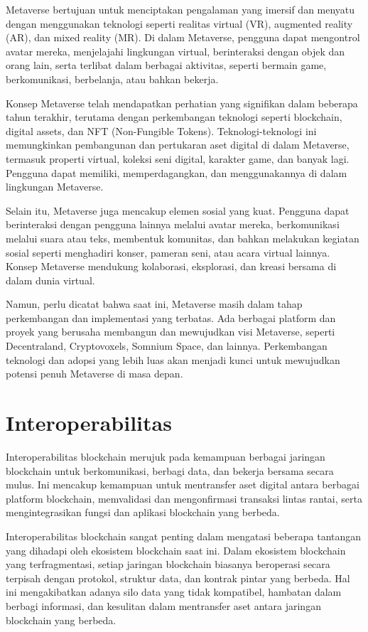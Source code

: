 Metaverse bertujuan untuk menciptakan pengalaman yang imersif dan menyatu dengan menggunakan teknologi seperti realitas virtual (VR), augmented reality (AR), dan mixed reality (MR). Di dalam Metaverse, pengguna dapat mengontrol
avatar mereka, menjelajahi lingkungan virtual, berinteraksi dengan objek dan orang lain, serta terlibat dalam berbagai aktivitas, seperti bermain game, berkomunikasi, berbelanja, atau bahkan bekerja. \parencite{kietzmann2011social}

Konsep Metaverse telah mendapatkan perhatian yang signifikan dalam beberapa tahun terakhir, terutama dengan perkembangan teknologi seperti blockchain, digital assets,
dan NFT (Non-Fungible Tokens). Teknologi-teknologi ini memungkinkan pembangunan dan pertukaran aset digital di dalam Metaverse, termasuk properti virtual, koleksi seni digital, karakter game, dan banyak lagi.
Pengguna dapat memiliki, memperdagangkan, dan menggunakannya di dalam lingkungan Metaverse.

Selain itu, Metaverse juga mencakup elemen sosial yang kuat. Pengguna dapat berinteraksi dengan pengguna lainnya melalui avatar mereka, berkomunikasi melalui suara atau teks, membentuk komunitas,
dan bahkan melakukan kegiatan sosial seperti menghadiri konser, pameran seni, atau acara virtual lainnya. Konsep Metaverse mendukung kolaborasi, eksplorasi, dan kreasi bersama di dalam dunia virtual.

Namun, perlu dicatat bahwa saat ini, Metaverse masih dalam tahap perkembangan dan implementasi yang terbatas. Ada berbagai platform dan proyek yang berusaha membangun dan mewujudkan visi Metaverse,
seperti Decentraland, Cryptovoxels, Somnium Space, dan lainnya. Perkembangan teknologi dan adopsi yang lebih luas akan menjadi kunci untuk mewujudkan potensi penuh Metaverse di masa depan. \parencite{castronova2005synthetic}

\section{Interoperabilitas}
Interoperabilitas blockchain merujuk pada kemampuan berbagai jaringan blockchain untuk berkomunikasi, berbagi data, dan bekerja bersama secara mulus. Ini mencakup kemampuan untuk mentransfer aset digital antara berbagai platform blockchain,
memvalidasi dan mengonfirmasi transaksi lintas rantai, serta mengintegrasikan fungsi dan aplikasi blockchain yang berbeda.

Interoperabilitas blockchain sangat penting dalam mengatasi beberapa tantangan yang dihadapi oleh ekosistem blockchain saat ini. Dalam ekosistem blockchain yang terfragmentasi, setiap jaringan blockchain biasanya beroperasi secara terpisah
dengan protokol, struktur data, dan kontrak pintar yang berbeda. Hal ini mengakibatkan adanya silo data yang tidak kompatibel, hambatan dalam berbagi informasi, dan kesulitan dalam mentransfer aset antara jaringan blockchain yang berbeda. \parencite{deangelis2019taxonomy}

